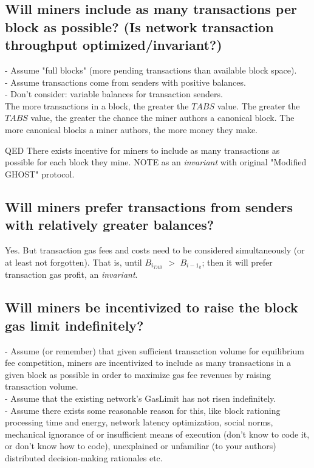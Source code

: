 \documentclass[11pt]{article}
\theoremstyle{plain}
\begin{document}
\subsection{\small{Will miners include as many transactions per block as
possible? (Is network transaction throughput optimized/invariant?)}}\label{sec:
S2}


- Assume "full blocks" (more pending transactions than available block space).
\\
- Assume transactions come from senders with positive balances. \\
- Don't consider: variable balances for transaction senders. \\

The more transactions in a block, the greater the $TABS$ value.
The greater the $TABS$ value, the greater the chance the miner authors a
canonical block.
The more canonical blocks a miner authors, the more money they make.

QED There exists incentive for miners to include as many transactions as
possible for each block they mine.
NOTE as an \textit{invariant} with original "Modified GHOST" protocol.

\subsection{\small{Will miners prefer transactions from senders with relatively
greater balances?}}\label{sec: S3}

Yes. But transaction gas fees and costs need to be considered simultaneously
(or at least not forgotten).
That is, until $B_{i}_{TAB}$ $>$ $B_{i-1}_{k}$; then it will prefer transaction
gas profit, an \textit{invariant}.

\subsection{\small{Will miners be incentivized to raise the block gas limit
indefinitely?}}\label{sec: S4}

- Assume (or remember) that given sufficient transaction volume for equilibrium
fee competition, miners
  are incentivized to include as many transactions in a given block as possible
in order to maximize
  gas fee revenues by raising transaction volume. \\
- Assume that the existing network's GasLimit has not risen indefinitely. \\
- Assume there exists some reasonable reason for this, like block rationing
processing time and energy,
  network latency optimization, social norms, mechanical ignorance of or
insufficient means of execution (don't know to code it, or don't know how to
code),
  unexplained or unfamiliar (to your authors) distributed decision-making
rationales etc. \\
\end{document}
